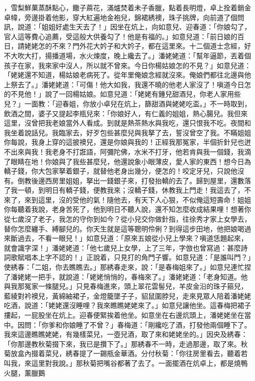 ，雪梨鮮菓蒸酥點心，饊子蔴花，滿爐焚着未子香臘，點着長明燈，卓上拴着銷金卓幃，旁邊掛着他影，穿大紅遍地金袍兒，錦裙綉襖，珠子挑牌，向前道了個問訊，說道：「姐姐好處生天去了！」因坐在炕上，向如意兒、迎春道：「你娘勾了，官人這等費心追薦，受這般大供養勾了！他是有福的。」如意兒道：「前日娘的百日，請姥姥怎的不來？門外花大妗子和大妗子，都在這里來。十二個道士念經，好不大吹大打，揚播道場，水火煉度，晚上纔去了。」潘姥姥道：「幫年逼節，丟着個孩子在家，我來家中沒人，所以就不曾來。今日你楊姑娘怎的不見？」如意兒道：「姥姥還不知道，楊姑娘老病死了。從年里俺娘念經就沒來。俺娘們都往北邊與他上祭去了。」潘姥姥道：「可傷！他大如我，我還不曉的他老人家沒了！嗔道今日怎的不見他！」說了一回楊姑娘。如意兒道：「姥姥有鍾兒甜酒兒，你老人家用些兒？」一面教：「迎春姐，你放小卓兒在炕上，篩甜酒與姥姥吃盃。」不一時取到，飲酒之間，婆子又提起李瓶兒來：「你娘好人，有仁義的姐姐，熱心腸兒。我但來這里，沒曾把我老娘當外人看成。到就是熱茶熱水與我吃，還只恨我不吃。夜間和我坐着說話兒。我臨家去，好歹包些甚麼兒與我拏了去，誓沒曾空了我。不瞞姐姐你每說，我身上穿的這披襖兒，還是你娘與我的！正經我那冤家，半個折針兒也迸不出來與我！我老身不打誑語，阿彌陀佛，水米不打牙，他若肯與我一個錢，我滴了眼睛在地！你娘與了我些甚麼兒，他還說象小眼薄皮，愛人家的東西！想今日為轎子錢，你大包家拏着銀子，就替他老身出幾分，便怎的！咬定牙兒，只說他沒有。倒教後邊西房里姐姐，拏出一錢銀子來，打發抬轎的去了。歸到屋里，還數落了我一頓，到明日有轎子錢，便教我來；沒轎子錢，休教我上門走！我這去了，不來了，來到這里，沒的受他的氣！隨他去，有天下人心狠，不似俺這短壽命！姐姐你每聽着我說，老身苦死了，他到明日不聽人說，還不知怎麼收成結果哩！想著你從七歲沒了老子，我怎的守你到如今？從小兒交你做針指，往徐秀才家上女學去，替你怎麼纏手、縛腳兒的。你天生就是這等聰明伶俐？到得這步田地，他把娘喝過來斷過去，不看一眼兒！」如意兒道：「原來五娘從小兒上學來？嗔道恁題起來，就會識字深！」潘姥姥道：「他七歲兒上女學，上了三年，字倣也曾寫過：甚麼詩詞歌賦唱本上字不認的！」正說着，只見打的角門子響。如意兒道：「是誰叫門？」使綉春：「二姐，你去瞧瞧去。」那綉春走來，說：「是春梅姐來了。」如意兒連忙捏了潘姥姥一把手，就說道：「姥姥悄悄的，春梅來了。」潘姥姥道：「老身知道。他與我那冤家一條腿兒。」只見春梅進來，頭上翠花雲髻兒，羊皮金沿的珠子箍兒，藍綾對衿襖兒，黃綿紬裙子，金燈籠墜子子，貂鼠圍脖兒，走來見眾人陪着潘姥姥吃酒，說道：「姥姥還沒睡哩？我來瞧瞧姥姥來了。」如意兒讓他坐。這春梅把裙子摟起，一屁股坐在炕上。迎春便緊挨着他坐。如意坐在右邊炕頭上，潘姥姥坐在當中。因問：「你爹和你娘睡了不曾？」春梅道：「剛纔吃了酒，打發他兩個睡下了。我來這邊瞧瞧姥姥，有幾樣菜兒，一壺兒酒，取了來和姥姥坐的。」因央及綉春：「你那邊教秋菊掇下來，我已是攢下了。」那綉春不一時，走過那邊，取了來。秋菊放盒內掇着菜兒，綉春提了一錫瓶金華酒。分付秋菊：「你往房里看去，聽着若叫我，來這里對我說。」那秋菊把嘴谷都著了去了。一面擺酒在炕卓上，都是燒鴨 火腿，薰臘鵝 